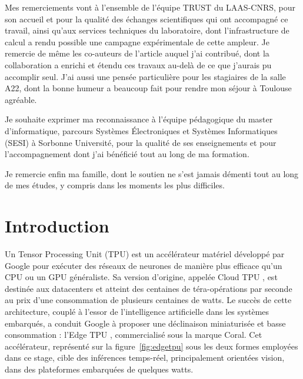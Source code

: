 \documentclass[11pt,a4paper]{report}
\newcommand{\margehauttdm}{-1.5cm}
\newcommand{\espaceapreschapitre}{0.5cm}
\let\origtableofcontents\tableofcontents
\renewcommand{\tableofcontents}{%
  \begingroup
  \titlespacing*{\chapter}{0pt}{\margehauttdm}{\espaceapreschapitre}%
  \origtableofcontents
  \endgroup
}
\begin{document}
Mes remerciements vont à l'ensemble de l'équipe TRUST du LAAS-CNRS, pour son accueil et pour la qualité des échanges scientifiques qui ont accompagné ce travail, ainsi qu'aux services techniques du laboratoire, dont l'infrastructure de calcul a rendu possible une campagne expérimentale de cette ampleur. Je remercie de même les co-auteurs de l'article auquel j'ai contribué, dont la collaboration a enrichi et étendu ces travaux au-delà de ce que j'aurais pu accomplir seul. J'ai aussi une pensée particulière pour les stagiaires de la salle A22, dont la bonne humeur a beaucoup fait pour rendre mon séjour à Toulouse agréable.

Je souhaite exprimer ma reconnaissance à l'équipe pédagogique du master d'informatique, parcours Systèmes Électroniques et Systèmes Informatiques (SESI) à Sorbonne Université, pour la qualité de ses enseignements et pour l'accompagnement dont j'ai bénéficié tout au long de ma formation.

Je remercie enfin ma famille, dont le soutien ne s'est jamais démenti tout au long de mes études, y compris dans les moments les plus difficiles.

\newpage

\tableofcontents

\newpage

\pagestyle{fancy}
\makeatletter
\let\ps@plain\psplainsauve
\makeatother

\chapter{Introduction}

Un Tensor Processing Unit (TPU) est un accélérateur matériel développé par Google pour exécuter des réseaux de neurones de manière plus efficace qu'un CPU ou un GPU généraliste. Sa version d'origine, appelée Cloud TPU \cite{jouppiInDatacenterPerformanceAnalysis2017a}, est destinée aux datacenters et atteint des centaines de téra-opérations par seconde au prix d'une consommation de plusieurs centaines de watts. Le succès de cette architecture, couplé à l'essor de l'intelligence artificielle dans les systèmes embarqués, a conduit Google à proposer une déclinaison miniaturisée et basse consommation : l'Edge TPU \cite{USBAcceleratorDatasheet}, commercialisé sous la marque Coral. Cet accélérateur, représenté sur la figure~\ref{fig:edgetpu} sous les deux formes employées dans ce stage, cible des inférences temps-réel, principalement orientées vision, dans des plateformes embarquées de quelques watts.
\end{document}

